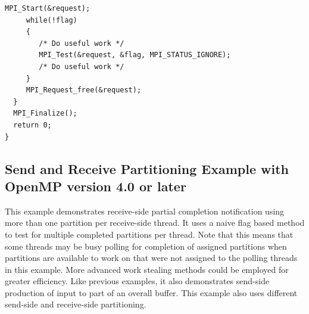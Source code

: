 \begin{example}
\begin{lstlisting}[language={[MPI]C},basicstyle=\lstsmall]
     MPI_Start(&request);
     while(!flag)
     {
        /* Do useful work */
        MPI_Test(&request, &flag, MPI_STATUS_IGNORE);
        /* Do useful work */
     }
     MPI_Request_free(&request);
  }
  MPI_Finalize();
  return 0;
}
\end{lstlisting}
\end{example}

\subsection{Send and Receive Partitioning Example with OpenMP version 4.0 or later}
This example demonstrates receive-side partial completion notification
using more than one partition per receive-side thread. It uses a naive flag 
based method to test for multiple completed partitions per thread.
Note that this means that some threads may be busy polling for completion of
assigned partitions when partitions are available to work on that were not 
assigned to the polling threads in this example. More advanced work stealing methods
could be employed for greater efficiency.
Like previous examples, it also demonstrates send-side production of
input to part of an overall buffer. This example also uses different send-side and
receive-side partitioning. 

